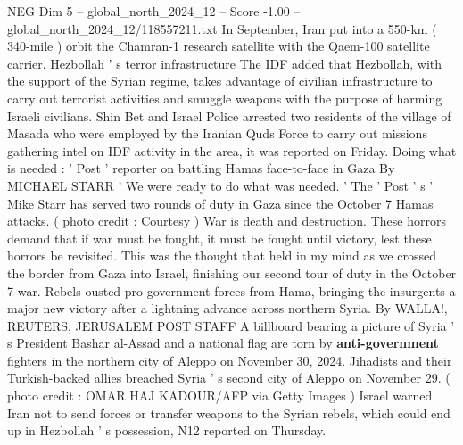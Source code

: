 \begin{textsample}{NEG Dim 5 – global\_north\_2024\_12 – Score -1.00 – global\_north\_2024\_12/118557211.txt}
In September, Iran put into a 550-km ( 340-mile ) orbit the Chamran-1 research satellite with the Qaem-100 satellite carrier.
Hezbollah ' s terror infrastructure The IDF added that Hezbollah, with the support of the Syrian regime, takes advantage of civilian infrastructure to carry out terrorist activities and smuggle weapons with the purpose of harming Israeli civilians.
Shin Bet and Israel Police arrested two residents of the village of Masada who were employed by the Iranian Quds Force to carry out missions gathering intel on IDF activity in the area, it was reported on Friday.
Doing what is needed : ' Post ' reporter on battling Hamas face-to-face in Gaza By MICHAEL STARR ' We were ready to do what was needed. ' The ' Post ' s ' Mike Starr has served two rounds of duty in Gaza since the October 7 Hamas attacks. ( photo credit : Courtesy ) War is death and destruction.
These horrors demand that if war must be fought, it must be fought until victory, lest these horrors be revisited.
This was the thought that held in my mind as we crossed the border from Gaza into Israel, finishing our second tour of duty in the October 7 war.
Rebels ousted pro-government forces from Hama, bringing the insurgents a major new victory after a lightning advance across northern Syria.
By WALLA!, REUTERS, JERUSALEM POST STAFF A billboard bearing a picture of Syria ' s President Bashar al-Assad and a national flag are torn by \textbf{anti-government} fighters in the northern city of Aleppo on November 30, 2024.
Jihadists and their Turkish-backed allies breached Syria ' s second city of Aleppo on November 29. ( photo credit : OMAR HAJ KADOUR/AFP via Getty Images ) Israel warned Iran not to send forces or transfer weapons to the Syrian rebels, which could end up in Hezbollah ' s possession, N12 reported on Thursday.

\end{textsample}
